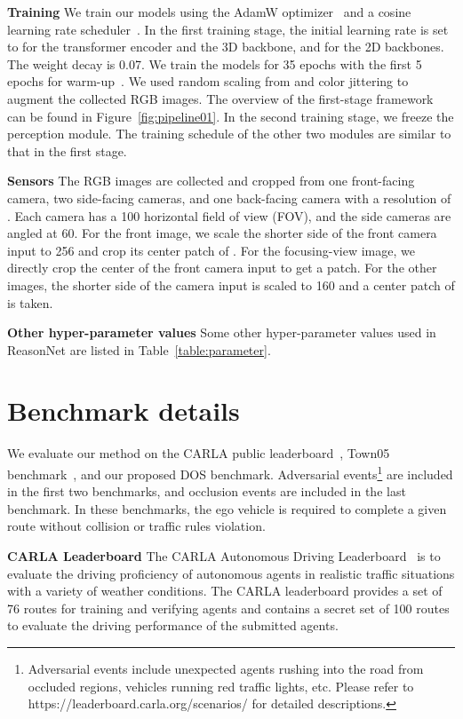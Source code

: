 \documentclass[10pt,twocolumn,letterpaper]{article}
\begin{document}
\noindent\textbf{Training} We train our models using the AdamW optimizer~\cite{loshchilov2018decoupled} and a cosine learning rate scheduler~\cite{loshchilov2016sgdr}. In the first training stage, the initial learning rate is set to  for the transformer encoder and the 3D backbone, and  for the 2D backbones. The weight decay is 0.07. We train the models for 35 epochs with the first 5 epochs for warm-up~\cite{he2016deep}. We used random scaling from  and color jittering to augment the collected RGB images. The overview of the first-stage framework can be found in Figure~\ref{fig:pipeline01}. In the second training stage, we freeze the perception module. The training schedule of the other two modules are similar to that in the first stage. 


\noindent\textbf{Sensors} The RGB images are collected and cropped from one front-facing camera, two side-facing cameras, and one back-facing camera with a resolution of . Each camera has a 100 horizontal field of view (FOV), and the side cameras are angled at 60. For the front image, we scale the shorter side of the front camera input to 256 and crop its center patch of . For the focusing-view image, we directly crop the center of the front camera input to get a  patch. For the other images, the shorter side of the camera input is scaled to 160 and a center patch of  is taken.  

\noindent\textbf{Other hyper-parameter values}
Some other hyper-parameter values used in ReasonNet are listed in Table~\ref{table:parameter}.

\section{Benchmark details}
\label{appendix: Benchmark details}

We evaluate our method on the CARLA public leaderboard~\cite{leaderboard}, Town05 benchmark~\cite{prakash2021multi}, and our proposed DOS benchmark. Adversarial events\footnote{Adversarial events include unexpected agents rushing into the road from occluded regions, vehicles running red traffic lights, etc. Please refer to
https://leaderboard.carla.org/scenarios/ for detailed descriptions.} are included in the first two benchmarks, and occlusion events are included in the last benchmark. In these benchmarks, the ego vehicle is required to complete a given route without collision or traffic rules violation. 

\noindent\textbf{CARLA Leaderboard} The CARLA Autonomous Driving Leaderboard~\cite{leaderboard} is to evaluate the driving proficiency of autonomous agents in realistic traffic situations with a variety of weather conditions. The CARLA leaderboard provides a set of 76 routes for training and verifying agents and contains a secret set of 100 routes to evaluate the driving performance of the submitted agents.
\end{document}
